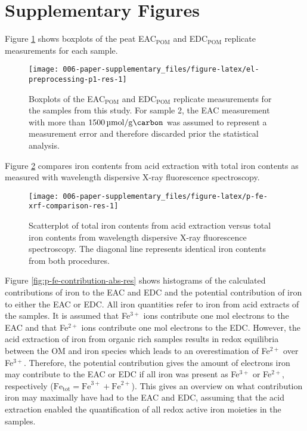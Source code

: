 \documentclass[draft,linenumbers]{agujournal2018}
\begin{document}
\clearpage

\section{Supplementary Figures}

Figure \ref{fig:el-preprocessing-p1-res} shows boxplots of the peat
EAC\(_\text{POM}\) and EDC\(_\text{POM}\) replicate measurements for
each sample.

\begin{figure}[H]

{\centering \texttt{[image: 006-paper-supplementary\_files/figure-latex/el-preprocessing-p1-res-1]} 

}

\caption{Boxplots of the EAC$_\text{POM}$ and EDC$_\text{POM}$ replicate measurements for the samples from this study. For sample 2, the EAC measurement with more than $\SI{1500}{\micro\mol\per\gram\carbon}$ was assumed to represent a measurement error and therefore discarded prior the statistical analysis.}\label{fig:el-preprocessing-p1-res}
\end{figure}

\clearpage

Figure \ref{fig:p-fe-xrf-comparison-res} compares iron contents from
acid extraction with total iron contents as measured with wavelength
dispersive X-ray fluorescence spectroscopy.

\begin{figure}[H]

{\centering \texttt{[image: 006-paper-supplementary\_files/figure-latex/p-fe-xrf-comparison-res-1]} 

}

\caption{Scatterplot of total iron contents from acid extraction versus total iron contents from wavelength dispersive X-ray fluorescence spectroscopy. The diagonal line represents identical iron contents from both procedures.}\label{fig:p-fe-xrf-comparison-res}
\end{figure}

Figure \ref{fig:p-fe-contribution-abs-res} shows histograms of the
calculated contributions of iron to the EAC and EDC and the potential
contribution of iron to either the EAC or EDC. All iron quantities refer
to iron from acid extracts of the samples. It is assumed that
Fe\(^{3+}\) ions contribute one mol electrons to the EAC and that
Fe\(^{2+}\) ions contribute one mol electrons to the EDC. However, the
acid extraction of iron from organic rich samples results in redox
equilibria between the OM and iron species which leads to an
overestimation of Fe\(^{2+}\) over Fe\(^{3+}\). Therefore, the potential
contribution gives the amount of electrons iron may contribute to the
EAC or EDC if all iron was present as Fe\(^{3+}\) or Fe\(^{2+}\),
respectively (\(\text{Fe}_\text{tot}=\text{Fe}^{3+} + \text{Fe}^{2+}\)).
This gives an overview on what contribution iron may maximally have had
to the EAC and EDC, assuming that the acid extraction enabled the
quantification of all redox active iron moieties in the samples.
\end{document}
